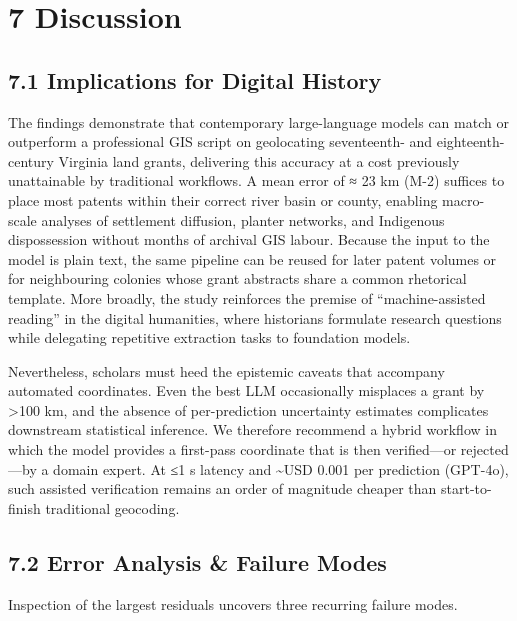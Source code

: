 \documentclass[
  11pt,
]{article}
\begin{document}
\section{7 Discussion}\label{discussion}

\subsection{7.1 Implications for Digital
History}\label{implications-for-digital-history}

The findings demonstrate that contemporary large-language models can
match or outperform a professional GIS script on geolocating
seventeenth- and eighteenth-century Virginia land grants, delivering
this accuracy at a cost previously unattainable by traditional
workflows. A mean error of ≈ 23 km (M-2) suffices to place most patents
within their correct river basin or county, enabling macro-scale
analyses of settlement diffusion, planter networks, and Indigenous
dispossession without months of archival GIS labour. Because the input
to the model is plain text, the same pipeline can be reused for later
patent volumes or for neighbouring colonies whose grant abstracts share
a common rhetorical template. More broadly, the study reinforces the
premise of ``machine-assisted reading'' in the digital humanities, where
historians formulate research questions while delegating repetitive
extraction tasks to foundation models.

Nevertheless, scholars must heed the epistemic caveats that accompany
automated coordinates. Even the best LLM occasionally misplaces a grant
by \textgreater100 km, and the absence of per-prediction uncertainty
estimates complicates downstream statistical inference. We therefore
recommend a hybrid workflow in which the model provides a first-pass
coordinate that is then verified---or rejected---by a domain expert. At
≤1 s latency and \textasciitilde USD 0.001 per prediction (GPT-4o), such
assisted verification remains an order of magnitude cheaper than
start-to-finish traditional geocoding.

\subsection{7.2 Error Analysis \& Failure
Modes}\label{error-analysis-failure-modes}

Inspection of the largest residuals uncovers three recurring failure
modes.
\end{document}
